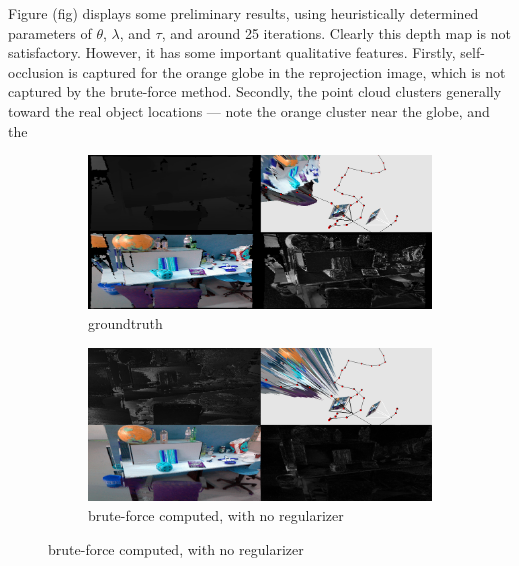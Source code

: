 \documentclass[conference]{IEEEtran}
\begin{document}
Figure (fig) displays some preliminary results, using heuristically determined parameters of $\theta$, $\lambda$, and $\tau$, and around 25 iterations.
Clearly this depth map is not satisfactory. However, it has some important qualitative features. Firstly, self-occlusion is captured for the
orange globe in the reprojection image, which is not captured by the brute-force method. Secondly, the point cloud clusters generally
toward the real object locations --- note the orange cluster near the globe, and the 


\begin{figure}[htbp]
\begin{subfigure}[b]{0.5\textwidth}
\centerline{\includegraphics[width=\textwidth]{figures/noisevis_groundtruth.png}}
\caption{groundtruth}
\label{noisevis_groundtruth}
\end{subfigure}
\begin{subfigure}[b]{0.5\textwidth}
\centerline{\includegraphics[width=\textwidth]{figures/noisevis_computed.png}}
\caption{brute-force computed, with no regularizer}
\label{noisevis_computed}
\end{subfigure}
\end{figure}
\end{document}
